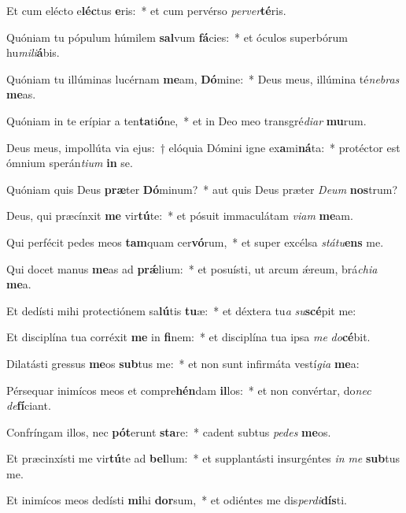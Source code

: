 \item Et cum elécto e\textbf{léc}tus \textbf{e}ris:~* et cum pervérso \textit{per}\textit{ver}\textbf{té}ris.
\item Quóniam tu pópulum húmilem \textbf{sal}vum \textbf{fá}cies:~* et óculos superbórum hu\textit{mi}\textit{li}\textbf{á}bis.
\item Quóniam tu illúminas lucérnam \textbf{me}am, \textbf{Dó}mine:~* Deus meus, illúmina té\textit{ne}\textit{bras} \textbf{me}as.
\item Quóniam in te erípiar a ten\textbf{ta}ti\textbf{ó}ne,~* et in Deo meo transgré\textit{di}\textit{ar} \textbf{mu}rum.
\item Deus meus, impollúta via ejus:~† elóquia Dómini igne ex\textbf{a}mi\textbf{ná}ta:~* protéctor est ómnium sperán\textit{ti}\textit{um} \textbf{in} se.
\item Quóniam quis Deus \textbf{præ}ter \textbf{Dó}minum?~* aut quis Deus præter \textit{De}\textit{um} \textbf{nos}trum?
\item Deus, qui præcínxit \textbf{me} vir\textbf{tú}te:~* et pósuit immaculátam \textit{vi}\textit{am} \textbf{me}am.
\item Qui perfécit pedes meos \textbf{tam}quam cer\textbf{vó}rum,~* et super excélsa \textit{stá}\textit{tu}\textbf{ens} me.
\item Qui docet manus \textbf{me}as ad \textbf{prǽ}lium:~* et posuísti, ut arcum ǽreum, brá\textit{chi}\textit{a} \textbf{me}a.
\item Et dedísti mihi protectiónem sa\textbf{lú}tis \textbf{tu}æ:~* et déxtera tu\textit{a} \textit{su}\textbf{scé}pit me:
\item Et disciplína tua corréxit \textbf{me} in \textbf{fi}nem:~* et disciplína tua ipsa \textit{me} \textit{do}\textbf{cé}bit.
\item Dilatásti gressus \textbf{me}os \textbf{sub}tus me:~* et non sunt infirmáta vestí\textit{gi}\textit{a} \textbf{me}a:
\item Pérsequar inimícos meos et compre\textbf{hén}dam \textbf{il}los:~* et non convértar, do\textit{nec} \textit{de}\textbf{fí}ciant.
\item Confríngam illos, nec \textbf{pót}erunt \textbf{sta}re:~* cadent subtus \textit{pe}\textit{des} \textbf{me}os.
\item Et præcinxísti me vir\textbf{tú}te ad \textbf{bel}lum:~* et supplantásti insurgéntes \textit{in} \textit{me} \textbf{sub}tus me.
\item Et inimícos meos dedísti \textbf{mi}hi \textbf{dor}sum,~* et odiéntes me dis\textit{per}\textit{di}\textbf{dís}ti.
